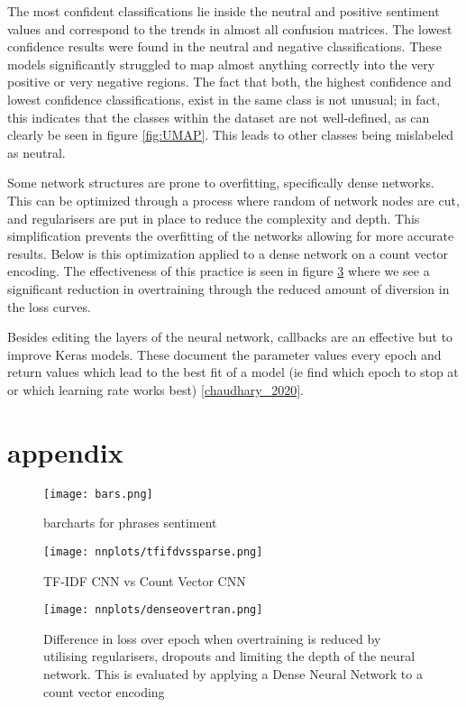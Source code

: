 \documentclass{article}
\begin{document}
The most confident classifications lie inside the neutral and positive sentiment values and correspond to the trends in almost all confusion matrices. The lowest confidence results were found in the neutral and negative classifications. These models significantly struggled to map almost anything correctly into the very positive or very negative regions. The fact that both, the highest confidence and lowest confidence classifications, exist in the same class is not unusual; in fact, this indicates that the classes within the dataset are not well-defined, as can clearly be seen in figure \ref{fig:UMAP}. This leads to other classes being mislabeled as neutral.

Some network structures are prone to overfitting, specifically dense networks. This can be optimized through a process where random of network nodes are cut, and regularisers are put in place to reduce the complexity and depth. This simplification prevents the overfitting of the networks allowing for more accurate results. Below is this optimization applied to a dense network on a count vector encoding. The effectiveness of this practice is seen in figure \ref{fig:overtrain} where we see a significant reduction in overtraining through the reduced amount of diversion in the loss curves.

Besides editing the layers of the neural network, callbacks are an effective but to improve Keras models. These document the parameter values every epoch and return values which lead to the best fit of a model (ie find which epoch to stop at or which learning rate works best) \ref{chaudhary_2020}.





\section{appendix}

\begin{figure}[H]%
    \texttt{[image: bars.png]}
    \caption{barcharts for phrases sentiment}
    \label{fig:appnedix0}
\end{figure}

\begin{figure}[H]%
    \texttt{[image: nnplots/tfifdvssparse.png]}
    \caption{TF-IDF CNN vs Count Vector CNN}
    \label{fig:bestmodel}
\end{figure}


\begin{figure}[H]%
     \texttt{[image: nnplots/denseovertran.png]}
     \caption{Difference in loss over epoch when overtraining is reduced by utilising regularisers, dropouts and limiting the depth of the neural network. This is evaluated by applying a Dense Neural Network to a count vector encoding}
     \label{fig:overtrain}
\end{figure}
\end{document}

